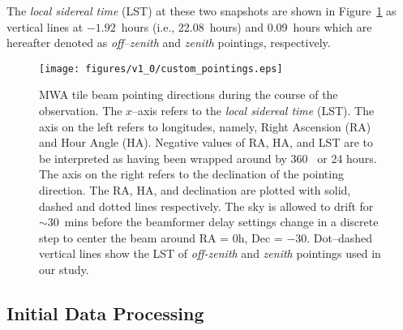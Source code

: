 \documentclass[preprint2,iop,numberedappendix]{emulateapj}
\begin{document}
The {\it local sidereal time} (LST) at these two snapshots are shown in Figure~\ref{fig:pointings} as vertical lines at $-1.92$~hours (i.e., 22.08~hours) and 0.09~hours which are hereafter denoted as {\it off--zenith} and {\it zenith} pointings, respectively. %

\begin{figure}[htb]
\centering
\texttt{[image: figures/v1\_0/custom\_pointings.eps]}
\caption{MWA tile beam pointing directions during the course of the observation. The $x$--axis refers to the {\it local sidereal time} (LST). The axis on the left refers to longitudes, namely, Right Ascension (RA) and Hour Angle (HA). Negative values of RA, HA, and LST are to be interpreted as having been wrapped around by 360\arcdeg~ or 24 hours. The axis on the right refers to the declination of the pointing direction. The RA, HA, and declination are plotted with solid, dashed and dotted lines respectively. The sky is allowed to drift for $\sim 30$~mins before the beamformer delay settings change in a discrete step to center the beam around RA = 0h, Dec = $-30$\arcdeg. Dot--dashed vertical lines show the LST of {\it off-zenith} and {\it zenith} pointings used in our study. \label{fig:pointings}}
\end{figure}

\subsection{Initial Data Processing}\label{sec:data-analysis}
\end{document}
